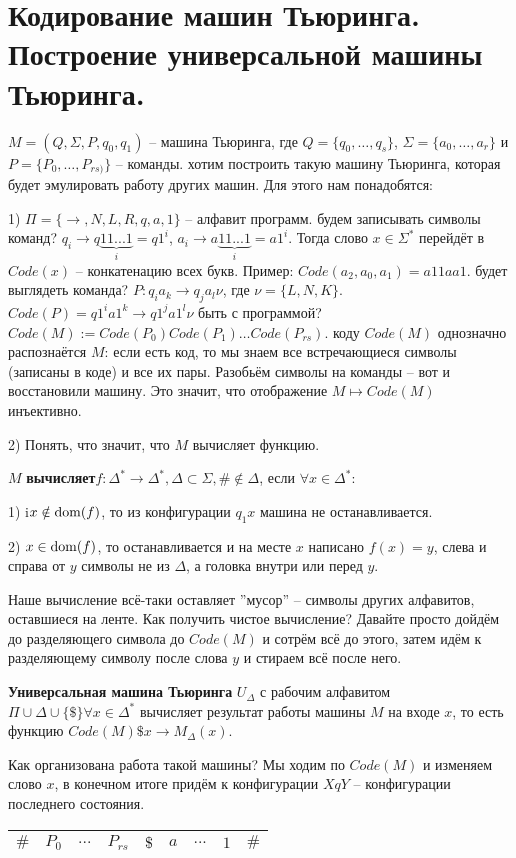 \section[Кодирование машин Тьюринга. Построение универсальной машины Тьюринга.]{\sloppy Кодирование машин Тьюринга.
Построение универсальной машины Тьюринга.}
 $M=(Q, \Sigma, P, q_{0}, q_{1})$ -- машина Тьюринга, где $Q = \{q_{0}, \dots, q_{s}\}$, $\Sigma =
\{a_{0}, \dots, a_{r}\}$ и $P = \{P_{0}, \dots,  P_{rs)}\}$ -- команды. 
 хотим построить такую машину Тьюринга, которая будет эмулировать работу других машин. Для этого нам понадобятся:
\par1) $\Pi = \{\rightarrow, N, L, R, q, a, 1\}$ -- алфавит программ.
 будем записывать символы команд? $q_{i} \rightarrow q\underbrace{11...1}_{i} = q1^i$, $a_{i} \rightarrow
a\underbrace{11...1}_{i} = a1^i$. Тогда слово $x \in \Sigma^*$ перейдёт в $Code(x)$ -- конкатенацию всех букв.
Пример: $Code(a_{2}, a_{0}, a_{1}) = a11aa1$.
 будет выглядеть команда? $ P: q_{i}a_{k} \rightarrow q_{j}a_{l}\nu$, где $\nu = \{L, N, K \}$. $Code(P) =
q1^i a1^k \rightarrow q1^j a1^l \nu$
 быть с программой? $Code(M) := Code(P_{0})Code(P_{1}) \dots Code(P_{rs})$.
 коду $Code(M)$ однозначно распознаётся $M$: если есть код, то мы знаем все встречающиеся символы (записаны в
коде) и все их пары. Разобьём символы на команды -- вот и восстановили машину. Это значит, что отображение $M
\mapsto Code(M)$ инъективно.
\par2) Понять, что значит, что $M$ вычисляет функцию.
\begin{definition}$M$ \textbf{вычисляет}$f : \Delta^* \rightarrow \Delta^*, \Delta \subset \Sigma, \# \notin
	\Delta$, если $\forall x \in \Delta^*$:
	\par1) i$x\notin\operatorname{dom}(f)$, то из конфигурации $q_{1}x$ машина не останавливается.
	\par2) $x \in\operatorname{dom}(f)$, то останавливается и на месте $x$ написано $f(x) = y$, слева и справа от $y$ символы не
	из $\Delta$, а головка внутри или перед $y$.
\end{definition}
Наше вычисление всё-таки оставляет ''мусор'' -- символы других алфавитов, оставшиеся на ленте. Как получить
чистое вычисление? Давайте просто дойдём до разделяющего символа до $Code(M)$ и сотрём всё до этого, затем идём к
разделяющему символу после слова $y$ и стираем всё после него.
\begin{definition}\textbf{Универсальная машина Тьюринга} $U_{\Delta}$ с рабочим алфавитом
	$\Pi\cup\Delta\cup\{\$\} \forall x \in \Delta^*$ вычисляет результат работы машины $M$ на входе $x$, то есть
	функцию $Code(M)\$x \rightarrow M_{\Delta}(x)$.
\end{definition}
Как организована работа такой машины? Мы ходим по $Code(M)$ и изменяем слово $x$, в конечном итоге придём к
конфигурации $XqY$ -- конфигурации последнего состояния. 

\begin{tabular}{ c|c|c|c|c|c|c|c|c } 
	\hline
	$\#$ & $P_{0}$ & $...$  & $P_{rs}$ & $\$$ & $a$ & $...$ & $1$ & $\#$ \\  \hline
\end{tabular}
